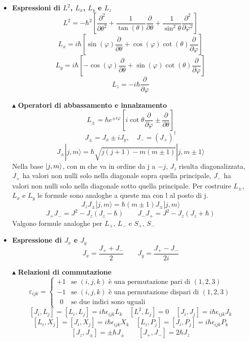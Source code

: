 \documentclass{book}
\newcommand{\g}{\textbf}
\newcommand{\e}{\begin{equation}}
\newcommand{\ex}{\end{equation} }
\renewcommand{\it}{\item[$\cdot$]}
\begin{document}
\begin{multicols}{4}
\begin{itemize}
    \it \g{Espressioni di $L^2$, $L_{x}$, $L_{y}$ e $L_{z}$}
    \e{L^2 = -\hbar^2 \left[ \frac{\partial^{2}}{\partial \theta^{2}} + \frac{1}{\tan(\theta)}\frac{\partial}{\partial  \theta} + \frac{1}{\sin^2\theta} \frac{\partial^2}{\partial \varphi^2} \right]} \ex
    \e{L_{x} = i \hbar \left[\sin(\varphi) \frac{\partial}{\partial \theta} + \cos(\varphi)\cot(\theta)\frac{\partial}{\partial \varphi}\right]}\ex
    \e{ L_{y} = i \hbar\left[-\cos(\varphi)\frac{\partial}{\partial \theta} + \sin(\varphi)\cot(\theta)\frac{\partial}{\partial\varphi}\right]}\ex
\e{L_{z} = - i \hbar \frac{\partial}{\partial \varphi}}\ex
    \item [$\blacktriangle$] \g{Operatori di abbassamento e innalzamento}
        \e{L_\pm = \hbar e^{\pm i\varphi} \left[i\cot\theta \frac{\partial}{\partial\varphi} \pm \frac{\partial}{\partial\theta}\right]} \ex
        \e{J_\pm = J_x \pm iJ_y, \quad J_- = (J_+)^\dagger} \ex
        \e{J_\pm |j, m\rangle = \hbar \sqrt{j(j+1) - m(m \pm 1)} |j, m \pm 1\rangle \label{azione J+ J-}} \ex
        Nella base $\ket{j,m}$, con m che va in ordine da j a $-j$, $J_{z}$ risulta diagonalizzata, $J_{+}$ ha valori non nulli solo nella diagonale sopra quella principale, $J_{-}$ ha valori non nulli solo nella diagonale sotto quella principale. Per costruire $L_{\pm}$, $L_{x}$ e $L_{y}$ le formule sono analoghe a queste ma con l al posto di j.
         \e{J_z J_\pm |j, m\rangle = \hbar(m \pm 1) J_\pm |j, m\rangle} \ex
         \e{J_{+}J_{-} = J^{2} - J_{z}\left(J_{z} - \hbar\right) \qquad J_{-}J_{+} = J^{2} - J_{z}\left(J_{z} + \hbar\right)}\ex
Valgono formule analoghe per $L_{+}$, $L_{-}$ e $S_{+}$, $S_{-}$
    \it \g{Espressione di $J_x$ e $J_y$}
        \e{J_x = \frac{J_+ + J_-}{2} \qquad J_y = \frac{J_+ - J_-}{2i} \label{Jx e Jy}} \ex

        

    \item [$\blacktriangle$] \g{Relazioni di commutazione}
    \begin{equation}
\varepsilon_{ijk} =
\begin{cases}
+1 & \text{se } (i,j,k) \text{ è una permutazione pari di } (1,2,3) \\
-1 & \text{se } (i,j,k) \text{ è una permutazione dispari di } (1,2,3) \\
\ \ 0 & \text{se due indici sono uguali}
\end{cases}
\end{equation}
        \e{[J_{i},L_{j}] = [L_i, L_j] = i\hbar \epsilon_{ijk} L_k \quad [L^2, L_j] = 0 \quad[J_i, J_j] = i\hbar \epsilon_{ijk} J_k } \ex \e{[L_i, X_j] = [J_i, X_j] = i\hbar \epsilon_{ijk} X_k \quad [L_i, P_j] = [J_i, P_j] = i\hbar \epsilon_{ijk} P_k} \ex
         \e{[J_z, J_\pm] = \pm \hbar J_\pm \qquad [J_+, J_-] = 2\hbar J_z} \ex
       


\end{itemize}
\end{multicols}
\end{document}
